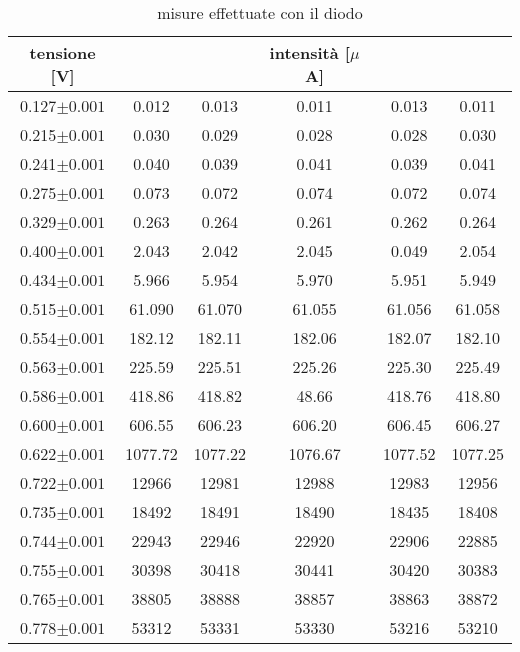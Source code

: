 \documentclass[a4paper]{article}
\theoremstyle{definition}
\begin{document}
 \begin{table}[!htbp]
    	\captionsetup{labelformat=empty}
        \caption{misure effettuate con il diodo }
    \begin{tabular}{c|ccccc}
        tensione [V] &&& intensità [$\mu$A]&& \\
        \hline
        \hline
        0.127\( \pm 0.001\) & 0.012& 0.013& 0.011& 0.013& 0.011\\
        \hline
        0.215\( \pm 0.001\) & 0.030& 0.029& 0.028& 0.028& 0.030\\
        \hline
        0.241\( \pm 0.001\) & 0.040& 0.039& 0.041& 0.039& 0.041\\
        \hline
        0.275\( \pm 0.001\) & 0.073& 0.072& 0.074& 0.072& 0.074\\
        \hline
        0.329\( \pm 0.001\) & 0.263& 0.264& 0.261& 0.262& 0.264\\
        \hline
        0.400\( \pm 0.001\) & 2.043& 2.042& 2.045& 0.049& 2.054\\
        \hline
        0.434\( \pm 0.001\) & 5.966& 5.954& 5.970& 5.951& 5.949\\
        \hline
        0.515\( \pm 0.001\) & 61.090& 61.070& 61.055& 61.056& 61.058\\
        \hline
        0.554\( \pm 0.001\) & 182.12& 182.11& 182.06& 182.07& 182.10\\
        \hline
        0.563\( \pm 0.001\) & 225.59& 225.51& 225.26& 225.30& 225.49\\
        \hline
        0.586\( \pm 0.001\) & 418.86& 418.82& 48.66& 418.76& 418.80\\
        \hline
        0.600\( \pm 0.001\) & 606.55& 606.23& 606.20& 606.45& 606.27\\
        \hline
        0.622\( \pm 0.001\) & 1077.72& 1077.22& 1076.67& 1077.52& 1077.25\\
        \hline
        0.722\( \pm 0.001\) & 12966& 12981& 12988& 12983& 12956\\
        \hline
        0.735\( \pm 0.001\) & 18492& 18491& 18490& 18435& 18408\\
        \hline
        0.744\( \pm 0.001\) & 22943& 22946& 22920& 22906& 22885 \\
        \hline
        0.755\( \pm 0.001\) & 30398& 30418& 30441& 30420& 30383\\
        \hline
        0.765\( \pm 0.001\) & 38805& 38888& 38857& 38863& 38872 \\
        \hline
        0.778\( \pm 0.001\) & 53312& 53331& 53330& 53216& 53210\\

\end{tabular}
\end{table}
\end{document}
